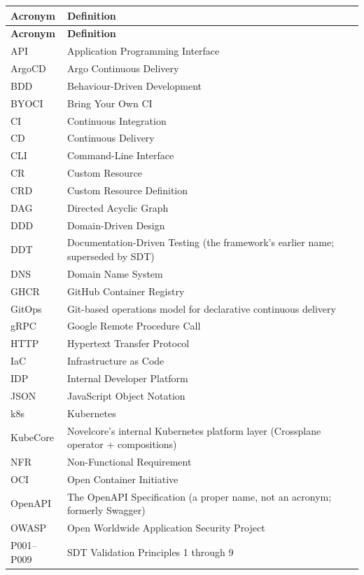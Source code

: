 \begin{longtable}{@{} l p{} @{}}
\toprule
\textbf{Acronym} & \textbf{Definition} \\
\midrule
\endfirsthead
\toprule
\textbf{Acronym} & \textbf{Definition} \\
\midrule
\endhead
\bottomrule
\endfoot
API     & Application Programming Interface \\
ArgoCD  & Argo Continuous Delivery \\
BDD     & Behaviour-Driven Development \\
BYOCI   & Bring Your Own CI \\
CI      & Continuous Integration \\
CD      & Continuous Delivery \\
CLI     & Command-Line Interface \\
CR      & Custom Resource \\
CRD     & Custom Resource Definition \\
DAG     & Directed Acyclic Graph \\
DDD     & Domain-Driven Design \\
DDT     & Documentation-Driven Testing (the framework's earlier name; superseded by SDT) \\
DNS     & Domain Name System \\
GHCR    & GitHub Container Registry \\
GitOps  & Git-based operations model for declarative continuous delivery \\
gRPC    & Google Remote Procedure Call \\
HTTP    & Hypertext Transfer Protocol \\
IaC     & Infrastructure as Code \\
IDP     & Internal Developer Platform \\
JSON    & JavaScript Object Notation \\
k8s     & Kubernetes \\
KubeCore & Novelcore's internal Kubernetes platform layer (Crossplane operator + compositions) \\
NFR     & Non-Functional Requirement \\
OCI     & Open Container Initiative \\
OpenAPI & The OpenAPI Specification (a proper name, not an acronym; formerly Swagger) \\
OWASP   & Open Worldwide Application Security Project \\
P001--P009 & SDT Validation Principles 1 through 9 \\

\end{longtable}
